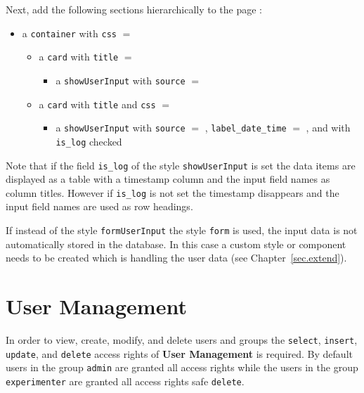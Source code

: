 \documentclass[a4paper,oneside]{book}
\begin{document}
Next, add the following sections hierarchically to the page :
\begin{itemize}
    \item a \texttt{container} with \texttt{css} $=$ 
        \begin{itemize}
            \item a \texttt{card} with \texttt{title} $=$ 
                \begin{itemize}
                    \item a \texttt{showUserInput} with \texttt{source} $=$ 
                \end{itemize}
            \item a \texttt{card} with \texttt{title}  and \texttt{css} $=$ 
                \begin{itemize}
                    \item a \texttt{showUserInput} with \texttt{source} $=$ , \texttt{label\_date\_time} $=$ , and with \texttt{is\_log} checked
                \end{itemize}
        \end{itemize}
\end{itemize}

Note that if the field \texttt{is\_log} of the style \texttt{showUserInput} is set the data items are displayed as a table with a timestamp column and the input field names as column titles.
However if \texttt{is\_log} is not set the timestamp disappears and the input field names are used as row headings.

If instead of the style \texttt{formUserInput} the style \texttt{form} is used, the input data is not automatically stored in the database.
In this case a custom style or component needs to be created which is handling the user data (see Chapter~\ref{sec.extend}).


\chapter{User Management}\label{sec.user}
In order to view, create, modify, and delete users and groups the \texttt{select}, \texttt{insert}, \texttt{update}, and \texttt{delete} access rights of \textbf{User Management} is required.
By default users in the group \texttt{admin} are granted all access rights while the users in the group \texttt{experimenter} are granted all access rights safe \texttt{delete}.
\end{document}
